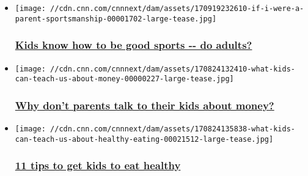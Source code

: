\begin{itemize}
\item
  \href{/2017/09/20/health/sportsmanship-teaching-kids-parenting/index.html}{}

  \texttt{[image: //cdn.cnn.com/cnnnext/dam/assets/170919232610-if-i-were-a-parent-sportsmanship-00001702-large-tease.jpg]}

  \hypertarget{kids-know-how-to-be-good-sports----do-adults}{%
  \subsubsection{\texorpdfstring{\href{/2017/09/20/health/sportsmanship-teaching-kids-parenting/index.html}{Kids
  know how to be good sports -\/- do
  adults?}}{Kids know how to be good sports -\/- do adults?}}\label{kids-know-how-to-be-good-sports----do-adults}}
\item
  \href{/2017/09/13/health/money-talking-to-kids-parenting/index.html}{}

  \texttt{[image: //cdn.cnn.com/cnnnext/dam/assets/170824132410-what-kids-can-teach-us-about-money-00000227-large-tease.jpg]}

  \hypertarget{why-dont-parents-talk-to-their-kids-about-money-}{%
  \subsubsection{\texorpdfstring{\href{/2017/09/13/health/money-talking-to-kids-parenting/index.html}{Why
  don't parents talk to their kids about money?
  }}{Why don't parents talk to their kids about money? }}\label{why-dont-parents-talk-to-their-kids-about-money-}}
\end{itemize}

\begin{itemize}
\item
  \href{/2017/08/30/health/kids-healthy-eating-parent-tips/index.html}{}

  \texttt{[image: //cdn.cnn.com/cnnnext/dam/assets/170824135838-what-kids-can-teach-us-about-healthy-eating-00021512-large-tease.jpg]}

  \hypertarget{11-tips-to-get-kids-to-eat-healthy-}{%
  \subsubsection{\texorpdfstring{\href{/2017/08/30/health/kids-healthy-eating-parent-tips/index.html}{11
  tips to get kids to eat healthy
  }}{11 tips to get kids to eat healthy }}\label{11-tips-to-get-kids-to-eat-healthy-}}
\end{itemize}

